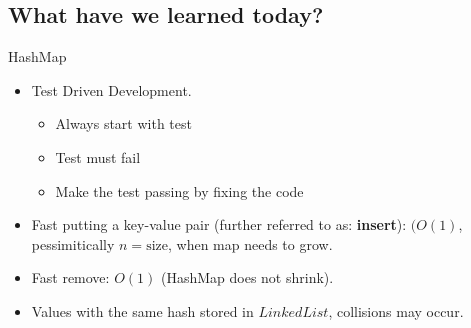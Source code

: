 \documentclass{beamer}
\begin{document}
\subsection{What have we learned today?}
\begin{frame}{HashMap}

    \begin{itemize}
        \item Test Driven Development.
        \begin{itemize}
            \item Always start with test \pause
            \item Test must fail \pause
            \item Make the test passing by fixing the code \pause
        \end{itemize}
        \item Fast putting a key-value pair (further referred to as: \textbf{insert}): $(O(1)$, pessimitically $n=\textrm{size}$, when map needs to grow.
        \item Fast remove: $O(1)$ (HashMap does not shrink).
        \item Values with the same hash stored in $LinkedList$, collisions may occur.
    \end{itemize}
\end{frame}






\end{document}
